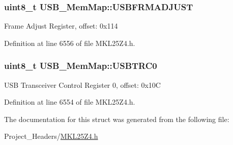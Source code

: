 \subsubsection[{\texorpdfstring{U\+S\+B\+F\+R\+M\+A\+D\+J\+U\+ST}{USBFRMADJUST}}]{\setlength{\rightskip}{0pt plus 5cm}uint8\+\_\+t U\+S\+B\+\_\+\+Mem\+Map\+::\+U\+S\+B\+F\+R\+M\+A\+D\+J\+U\+ST}\hypertarget{struct_u_s_b___mem_map_a1bb1b3975dfcbbe78635e2d08b16553d}{}\label{struct_u_s_b___mem_map_a1bb1b3975dfcbbe78635e2d08b16553d}
Frame Adjust Register, offset\+: 0x114 

Definition at line 6556 of file M\+K\+L25\+Z4.\+h.

\subsubsection[{\texorpdfstring{U\+S\+B\+T\+R\+C0}{USBTRC0}}]{\setlength{\rightskip}{0pt plus 5cm}uint8\+\_\+t U\+S\+B\+\_\+\+Mem\+Map\+::\+U\+S\+B\+T\+R\+C0}\hypertarget{struct_u_s_b___mem_map_a10d494a848ee49ff264d62eb0bfb439e}{}\label{struct_u_s_b___mem_map_a10d494a848ee49ff264d62eb0bfb439e}
U\+SB Transceiver Control Register 0, offset\+: 0x10C 

Definition at line 6554 of file M\+K\+L25\+Z4.\+h.



The documentation for this struct was generated from the following file\+:\begin{DoxyCompactItemize}
\item 
Project\+\_\+\+Headers/\hyperlink{_m_k_l25_z4_8h}{M\+K\+L25\+Z4.\+h}\end{DoxyCompactItemize}

